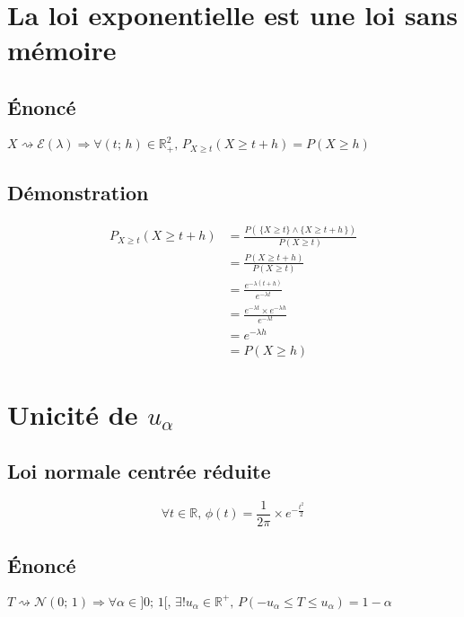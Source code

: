 \documentclass[12px]{article}
\begin{document}
	\section{La loi exponentielle est une loi sans mémoire}
	
	\subsection{\'Enoncé}
	$X\rightsquigarrow\mathcal{E}(\lambda) \Rightarrow \forall (t;\, h)\in\mathbb{R}_+^2,
	\,P_{X\geq t}(X\geq t+h) = P(X\geq h)$
	
	\subsection{Démonstration}
	\begin{align*}
	P_{X\geq t}(X\geq t+h) &= \frac{ P(\,\{X\geq t\} \wedge \{X\geq t+h\,\} ) }{P(X\geq t)}\\
	&= \frac{P(X\geq t+h)}{P(X\geq t)}\\
	&= \frac{ e^{-\lambda (t+h)} }{ e^{-\lambda t} }\\
	&= \frac{ e^{-\lambda t}\times e^{-\lambda h} }{ e^{-\lambda t} }\\
	&= e^{-\lambda h}\\
	&= P(X\geq h)
	\end{align*}
	
	\section{Unicité de $u_\alpha$}
	
	\subsection{Loi normale centrée réduite}
	\begin{displaymath}
		\forall t\in\mathbb{R},\, \phi (t) = \frac{1}{2\pi}\times e^{ -\frac{t^2}{2} }
	\end{displaymath}
	
	\subsection{\'Enoncé}
	$T\rightsquigarrow\mathcal{N}(0;\, 1)\Rightarrow
	\forall \alpha\in ]0;\, 1[,\, \exists ! u_\alpha\in\mathbb{R}^+,\, P(-u_\alpha\leq T\leq
	u_\alpha) = 1 - \alpha$\\
	
\end{document}
